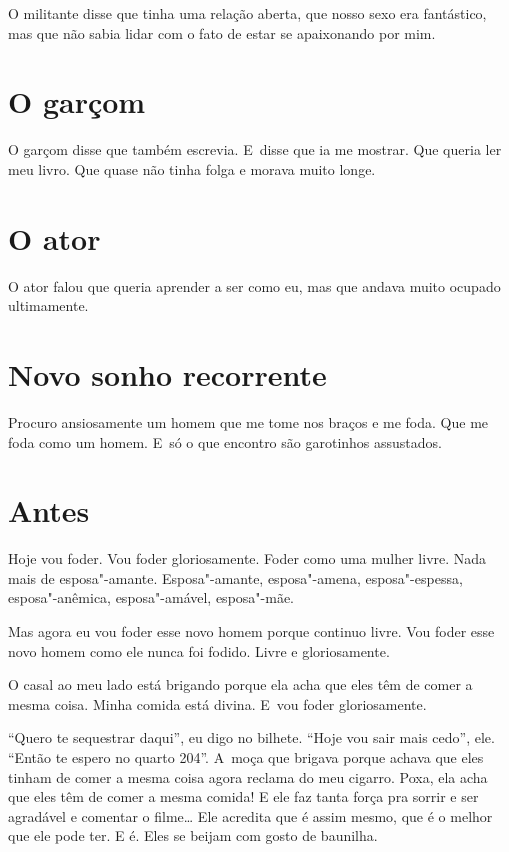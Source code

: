 O militante disse que tinha uma relação aberta, que nosso sexo era
fantástico, mas que não sabia lidar com o fato de estar se apaixonando
por mim.

\chapter{O garçom}

O garçom disse que também escrevia. E~disse que ia me mostrar. Que
queria ler meu livro. Que quase não tinha folga e morava muito longe.

\chapter{O ator}

O ator falou que queria aprender a ser como eu, mas que andava muito
ocupado ultimamente.

\chapter{Novo sonho recorrente}

Procuro ansiosamente um homem que me tome nos braços e me foda. Que me
foda como um homem. E~só o que encontro são garotinhos assustados.

\chapter{Antes}

Hoje vou foder. Vou foder gloriosamente. Foder como uma mulher livre.
Nada mais de esposa"-amante. Esposa"-amante, esposa"-amena, esposa"-espessa,
esposa"-anêmica, esposa"-amável, esposa"-mãe.

Mas agora eu vou foder esse novo homem porque continuo livre. Vou foder
esse novo homem como ele nunca foi fodido. Livre e gloriosamente.

O casal ao meu lado está brigando porque ela acha que eles têm de comer
a mesma coisa. Minha comida está divina. E~vou foder gloriosamente.

``Quero te sequestrar daqui'', eu digo no bilhete. ``Hoje vou sair mais
cedo'', ele. ``Então te espero no quarto 204''. A~moça que brigava
porque achava que eles tinham de comer a mesma coisa agora reclama do
meu cigarro. Poxa, ela acha que eles têm de comer a mesma comida! E ele
faz tanta força pra sorrir e ser agradável e comentar o filme…
Ele acredita que é assim mesmo, que é o melhor que ele pode ter. E é.
Eles se beijam com gosto de baunilha.


